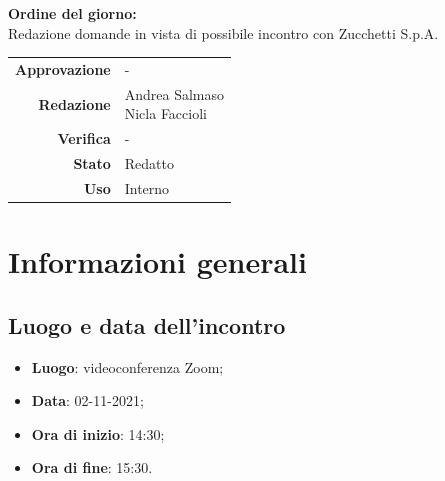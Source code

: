 \documentclass[11pt]{article}
\begin{document}
\begin{titlepage}
\begin{center}
			\large
			
			\vfill
			\textbf{Ordine del giorno:} \\
			Redazione domande in vista di possibile incontro con Zucchetti S.p.A.
			
			
			\vfill
			
			
			\begin{tabular}{r|l}
				\textbf{Approvazione} &  -\\
				\textbf{Redazione} &  \parbox[t]{5cm}{Andrea Salmaso \\Nicla Faccioli}\\
				\textbf{Verifica} &  -\\
				\textbf{Stato} & Redatto \\
				\textbf{Uso} & Interno
			\end{tabular}
			\vfill
			
		\end{center}
	\end{titlepage}

	\section{Informazioni generali}
	\subsection{Luogo e data dell'incontro}
	\begin{itemize}
		\item \textbf{Luogo}: videoconferenza Zoom;
		\item \textbf{Data}: 02-11-2021;
		\item \textbf{Ora di inizio}: 14:30;
		\item \textbf{Ora di fine}: 15:30.
	\end{itemize}
	
\end{document}
